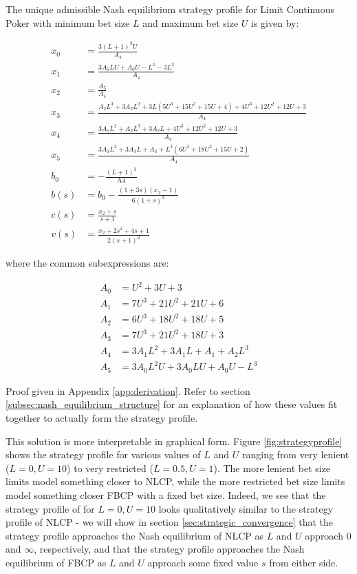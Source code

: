 \documentclass[../../main/main.tex]{subfiles}
\begin{document}
\begin{theorem}
    \label{thm:nash_equilibrium}
The unique admissible Nash equilibrium strategy profile for Limit Continuous Poker with minimum bet size $L$ and maximum bet size $U$ is given by:

\begin{align*}
    x_0 &= \frac{3 (L+1)^3 U}{A_4}\\
    x_1 &= \frac{3 A_0 L U+A_0 U-L^3-3 L^2}{A_4}\\
    x_2 &= \frac{A_5}{A_4}\\
    x_3 &= \frac{A_2 L^3+3 A_2 L^2+3 L \left(5 U^3+15 U^2+15 U+4\right)+4 U^3+12 U^2+12 U+3}{A_4}\\
    x_4 &= \frac{3 A_1 L^2+A_2 L^3+3 A_2 L+4 U^3+12 U^2+12 U+3}{A_4}\\
    x_5 &= \frac{3 A_3 L^2+3 A_3 L+A_3+L^3 \left(6 U^3+18 U^2+15 U+2\right)}{A_4}\\
    b_0 &= -\frac{(L+1)^3}{\text{A4}} \\ 
    b(s) &= b_0 - \frac{(1+3s)(x_2-1)}{6(1+s)^3}\\
    c(s) &= \frac{x_2+s}{s+1}\\
    v(s) &= \frac{x_2+2 s^2+4 s+1}{2 (s+1)^2}
\end{align*}

where the common subexpressions are:

\begin{align*}
	A_0 &= U^2+3 U+3 \\
    A_1 &= 7 U^3+21 U^2+21 U+6 \\
    A_2 &= 6 U^3+18 U^2+18 U+5 \\
    A_3 &= 7 U^3+21 U^2+18 U+3 \\
    A_4 &= 3 A_1 L^2+3 A_1 L+A_1+A_2 L^3 \\
    A_5 &= 3 A_0 L^2 U+3 A_0 L U+A_0 U-L^3
\end{align*}
\end{theorem}

Proof given in Appendix \ref{app:derivation}. Refer to section \ref{subsec:nash_equilibrium_structure} for an explanation of how these values fit together to actually form the strategy profile.

This solution is more interpretable in graphical form. Figure \ref{fig:strategyprofile} shows the strategy profile for various values of $L$ and $U$ ranging from very lenient ($L=0, U=10$) to very restricted ($L=0.5, U=1$). The more lenient bet size limits model something closer to NLCP, while the more restricted bet size limits model something closer FBCP with a fixed bet size. Indeed, we see that the strategy profile of for $L=0, U=10$ looks qualitatively similar to the strategy profile of NLCP - we will show in section \ref{sec:strategic_convergence} that the strategy profile approaches the Nash equilibrium of NLCP as $L$ and $U$ approach $0$ and $\infty$, respectively, and that the strategy profile approaches the Nash equilibrium of FBCP as $L$ and $U$ approach some fixed value $s$ from either side.
\end{document}
